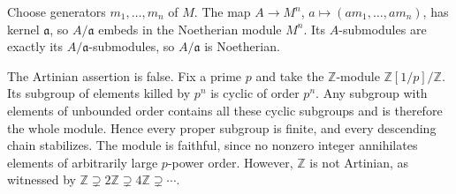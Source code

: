 Choose generators $m_1,\ldots,m_n$ of $M$. The map $A\to M^n$, $a\mapsto(am_1,\ldots,am_n)$, has kernel $\mathfrak a$, so $A/\mathfrak a$ embeds in the Noetherian module $M^n$. Its $A$-submodules are exactly its $A/\mathfrak a$-submodules, so $A/\mathfrak a$ is Noetherian.

The Artinian assertion is false. Fix a prime $p$ and take the $\mathbb Z$-module $\mathbb Z[1/p]/\mathbb Z$. Its subgroup of elements killed by $p^n$ is cyclic of order $p^n$. Any subgroup with elements of unbounded order contains all these cyclic subgroups and is therefore the whole module. Hence every proper subgroup is finite, and every descending chain stabilizes. The module is faithful, since no nonzero integer annihilates elements of arbitrarily large $p$-power order. However, $\mathbb Z$ is not Artinian, as witnessed by $\mathbb Z\supsetneq2\mathbb Z\supsetneq4\mathbb Z\supsetneq\cdots$.

